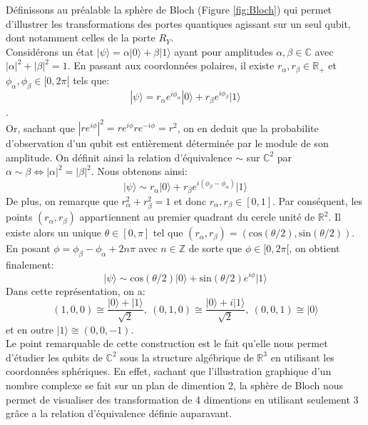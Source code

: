 Définissons au préalable la sphère de Bloch (Figure \ref{fig:Bloch}) qui permet d'illustrer les transformations des portes quantiques agissant sur un seul qubit, dont notamment celles de la porte $R_Y$.
\\
Considérons un état $|\psi \rangle =\alpha |0\rangle +\beta |1\rangle$ ayant pour amplitudes $\alpha ,\beta \in \mathbb{C}$ avec $|\alpha|^{2}+|\beta |^{2}=1$. En passant aux coordonnées polaires, il existe $r_{\alpha}, r_{\beta} \in \mathbb{R}_+$ et $\phi_{\alpha}, \phi_{\beta} \in [0,2\pi[$ tels que:
\[|\psi \rangle = r_{\alpha}e^{i\phi_{\alpha}}|0\rangle + r_{\beta}e^{i\phi_{\beta}} |1\rangle\]. 
\\
Or, sachant que $|re^{i\phi}|^2 = re^{i\phi}re^{-i\phi} = r^2$, on en deduit que la probabilite d'observation d'un qubit est entièrement déterminée par le module de son amplitude. On définit ainsi la relation d'équivalence $\sim$ sur $\mathbb{C}^2$ par $\alpha \sim \beta \iff |\alpha|^2=|\beta|^2$. Nous obtenons ainsi:
\[|\psi \rangle \sim r_{\alpha}|0\rangle + r_{\beta}e^{i(\phi_{\beta}-\phi_{\alpha})} |1\rangle\]
De plus, on remarque que $r_{\alpha}^2+r_{\beta}^2=1$ et donc $r_{\alpha}, r_{\beta} \in [0,1]$. Par conséquent, les points $(r_{\alpha}, r_{\beta})$ appartiennent au premier quadrant du cercle unité de $\mathbb{R}^2$. Il existe alors un unique $\theta \in [0,\pi]$ tel que $(r_{\alpha}, r_{\beta}) = (\mathrm{cos}(\theta/2),\mathrm{sin}(\theta/2))$. En posant $\phi = \phi_{\beta}-\phi_{\alpha} + 2n\pi$ avec $n \in \mathbb{Z}$ de sorte que $\phi \in [0,2\pi[$, on obtient finalement:
\[|\psi \rangle \sim \mathrm{cos}(\theta/2)|0\rangle + \mathrm{sin}(\theta/2)e^{i\phi}|1\rangle\]
Dans cette représentation, on a:
\[(1,0,0) \cong \frac{|0\rangle+|1\rangle}{\sqrt{2}}, \ (0,1,0) \cong \frac{|0\rangle+i|1\rangle}{\sqrt{2}}, \ (0,0,1) \cong |0\rangle\]
et en outre $|1\rangle \cong (0,0,-1)$.
\\
Le point remarquable de cette construction est le fait qu'elle nous permet d’étudier les qubits de $\mathbb{C}^2$ sous la structure algébrique de $\mathbb{R}^3$ en utilisant les coordonnées sphériques. En effet, sachant que l'illustration graphique d'un nombre complexe se fait sur un plan de dimention 2, la sphère de Bloch nous permet de visualiser des transformation de 4 dimentions en utilisant seulement 3 grâce a la relation d'équivalence définie auparavant. 

